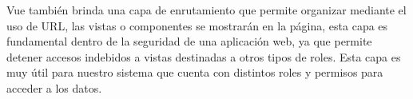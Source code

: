 



Vue también brinda una capa de enrutamiento que permite organizar mediante el uso de URL, las vistas o componentes se mostrarán en la página, esta capa es fundamental dentro de la seguridad de una aplicación web, ya que permite detener accesos indebidos a vistas destinadas a otros tipos de roles.
Esta capa es muy útil para nuestro sistema que cuenta con distintos roles y permisos para acceder a los datos.


